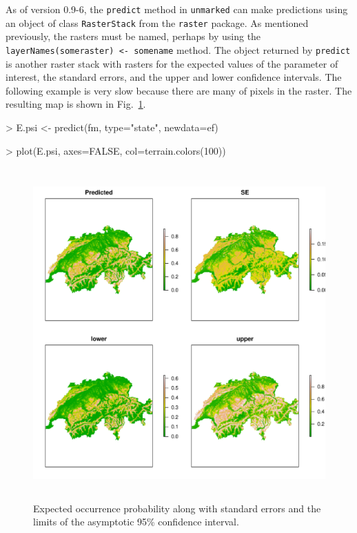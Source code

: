 \documentclass[a4paper]{article}
\renewenvironment{Schunk}{\vspace{\topsep}}{\vspace{\topsep}}
\begin{document}
As of version 0.9-6, the \verb+predict+ method in \texttt{unmarked}
can make predictions using an object of class \verb+RasterStack+ from the
\texttt{raster} package. As mentioned previously, the rasters must be
named, perhaps by using the \verb+layerNames(someraster) <- somename+
method. The object
returned by \verb+predict+ is another raster stack with rasters for
the expected values of the parameter of interest, the standard errors,
and the upper and lower confidence intervals. The following example
is very slow because there are many of pixels in the raster. The
resulting map is shown in Fig.~\ref{fig:predict}.

\begin{Schunk}
\begin{Sinput}
> E.psi <- predict(fm, type="state", newdata=ef)
\end{Sinput}
\begin{Sinput}
> plot(E.psi, axes=FALSE, col=terrain.colors(100))
\end{Sinput}
\end{Schunk}
\begin{figure}%
  \centering
\includegraphics[width=5in,height=5in]{spp-dist-psi2}
\caption{Expected occurrence probability along with standard errors
  and the limits of the asymptotic 95\% confidence interval.}
\label{fig:predict}
\end{figure}
\end{document}
